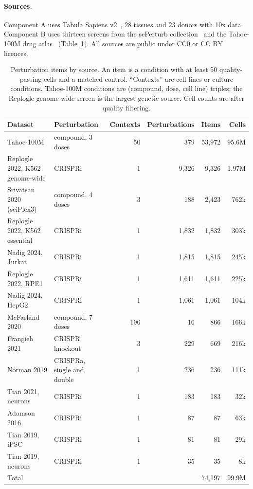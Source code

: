 \documentclass[11pt]{article}
\begin{document}
\paragraph{Sources.}
Component A uses Tabula Sapiens v2~\cite{tabulasapiens2}, 28 tissues and 23 donors with 10x data. Component B
uses thirteen screens from the scPerturb collection~\cite{scperturb} and the Tahoe-100M drug atlas~\cite{tahoe}
(Table~\ref{tab:compB}). All sources are public under CC0 or CC BY licences.

\begin{table}[t]
\centering
\small
\caption{Perturbation items by source. An item is a condition with at least 50
quality-passing cells and a matched control. ``Contexts'' are cell lines or culture
conditions. Tahoe-100M conditions are (compound, dose, cell line) triples; the Replogle
genome-wide screen is the largest genetic source. Cell counts are after quality filtering.}
\label{tab:compB}
\begin{tabular}{@{}llrrrr@{}}
\toprule
Dataset & Perturbation & Contexts & Perturbations & Items & Cells \\
\midrule
Tahoe-100M & compound, 3 doses & 50 & 379 & 53,972 & 95.6M \\
Replogle 2022, K562 genome-wide & CRISPRi & 1 & 9,326 & 9,326 & 1.97M \\
Srivatsan 2020 (sciPlex3) & compound, 4 doses & 3 & 188 & 2,423 & 762k \\
Replogle 2022, K562 essential & CRISPRi & 1 & 1,832 & 1,832 & 303k \\
Nadig 2024, Jurkat & CRISPRi & 1 & 1,815 & 1,815 & 245k \\
Replogle 2022, RPE1 & CRISPRi & 1 & 1,611 & 1,611 & 225k \\
Nadig 2024, HepG2 & CRISPRi & 1 & 1,061 & 1,061 & 104k \\
McFarland 2020 & compound, 7 doses & 196 & 16 & 866 & 166k \\
Frangieh 2021 & CRISPR knockout & 3 & 229 & 669 & 216k \\
Norman 2019 & CRISPRa, single and double & 1 & 236 & 236 & 111k \\
Tian 2021, neurons & CRISPRi & 1 & 183 & 183 & 32k \\
Adamson 2016 & CRISPRi & 1 & 87 & 87 & 63k \\
Tian 2019, iPSC & CRISPRi & 1 & 81 & 81 & 29k \\
Tian 2019, neurons & CRISPRi & 1 & 35 & 35 & 8k \\
\midrule
Total & & & & 74,197 & 99.9M \\
\bottomrule
\end{tabular}
\end{table}
\end{document}
